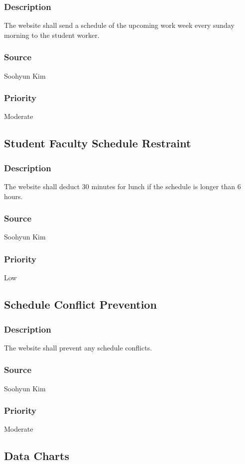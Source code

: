 \subsubsection{Description}
The website shall send a schedule of the upcoming work week every sunday morning to the student worker.
\subsubsection{Source}
Soohyun Kim
\subsubsection{Priority}
Moderate

\subsection{Student Faculty Schedule Restraint}
\subsubsection{Description}
The website shall deduct 30 minutes for lunch if the schedule is longer than 6 hours.
\subsubsection{Source}
Soohyun Kim
\subsubsection{Priority}
Low

\subsection{Schedule Conflict Prevention}
\subsubsection{Description}
The website shall prevent any schedule conflicts.
\subsubsection{Source}
Soohyun Kim
\subsubsection{Priority}
Moderate

\subsection{Data Charts}
